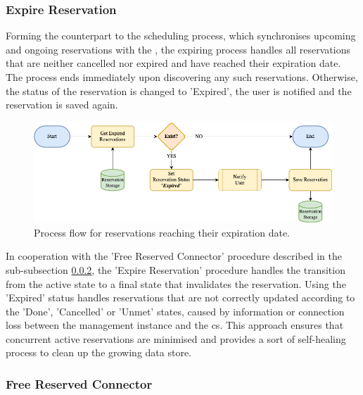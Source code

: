 \subsubsection{Expire Reservation}
\label{ch:Design:sec:Reservation System:ssec:Scheduling Capabilities:sssec:Expire Reservation}

Forming the counterpart to the scheduling process, which synchronises upcoming and ongoing reservations with the , the expiring process handles all reservations that are neither cancelled nor expired and have reached their expiration date.
The process ends immediately upon discovering any such reservations. Otherwise, the status of the reservation is changed to 'Expired', the user is notified and the reservation is saved again.

\begin{figure}[h]
    \centering
    \includegraphics[scale=0.4]{resources/images/main/5_design/processes/scheduler/UpdateExpiredReservations.png}
    \caption{Process flow for reservations reaching their expiration date.}
    \label{fig:expire-reservation-flowchart}
\end{figure}

\noindent In cooperation with the 'Free Reserved Connector' procedure described in the sub-subsection \ref{ch:Design:sec:Reservation System:ssec:Scheduling Capabilities:sssec:Free Reserved Connector}, the 'Expire Reservation' procedure handles the transition from the active state to a final state that invalidates the reservation.
Using the 'Expired' status handles reservations that are not correctly updated according to the 'Done', 'Cancelled' or 'Unmet' states, caused by information or connection loss between the management instance and the \acrshort{cs}.
This approach ensures that concurrent active reservations are minimised and provides a sort of self-healing process to clean up the growing data store.

\subsubsection{Free Reserved Connector}
\label{ch:Design:sec:Reservation System:ssec:Scheduling Capabilities:sssec:Free Reserved Connector}

